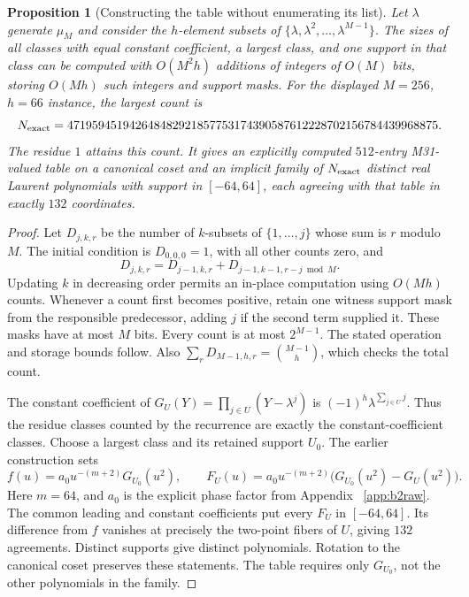 \documentclass[11pt,letterpaper]{article}
\newtheorem{proposition}[theorem]{Proposition}
\theoremstyle{definition}
\theoremstyle{remark}
\begin{document}
\begin{proposition}[Constructing the table without enumerating its list]
\label{prop:implicit-bank}
Let $\lambda$ generate $\mu_M$ and consider the $h$-element subsets of
$\{\lambda,\lambda^2,\ldots,\lambda^{M-1}\}$. The sizes of all classes
with equal constant coefficient, a largest class, and one support in
that class can be computed with $O(M^2h)$ additions of integers of
$O(M)$ bits, storing $O(Mh)$ such integers and support masks.
For the displayed $M=256$, $h=66$ instance, the largest count is
\[
 N_{\rm exact}=
 471959451942648482921857753174390587612228702156784439968875.
\]
The residue $1$ attains this count. It gives an explicitly computed
$512$-entry M31-valued table on a canonical coset and an implicit
family of $N_{\rm exact}$ distinct real Laurent polynomials with
support in $[-64,64]$, each agreeing with that table in exactly
$132$ coordinates.
\end{proposition}
\begin{proof}
Let $D_{j,k,r}$ be the number of $k$-subsets of $\{1,\ldots,j\}$ whose
sum is $r$ modulo $M$. The initial condition is $D_{0,0,0}=1$, with
all other counts zero, and
\[
 D_{j,k,r}=D_{j-1,k,r}+D_{j-1,k-1,r-j\bmod M}.
\]
Updating $k$ in decreasing order permits an in-place computation using
$O(Mh)$ counts. Whenever a count first becomes positive, retain one
witness support mask from the responsible predecessor, adding $j$ if
the second term supplied it. These masks have at most $M$ bits.
Every count is at most $2^{M-1}$. The stated operation and storage
bounds follow. Also
$\sum_rD_{M-1,h,r}=\binom{M-1}h$, which checks the total count.

The constant coefficient of
$G_U(Y)=\prod_{j\in U}(Y-\lambda^j)$ is
$(-1)^h\lambda^{\sum_{j\in U}j}$. Thus the residue classes counted by
the recurrence are exactly the constant-coefficient classes. Choose a
largest class and its retained support $U_0$. The earlier construction
sets
\[
 f(u)=a_0u^{-(m+2)}G_{U_0}(u^2),\qquad
 F_U(u)=a_0u^{-(m+2)}\bigl(G_{U_0}(u^2)-G_U(u^2)\bigr).
\]
Here $m=64$, and $a_0$ is the explicit phase factor from Appendix~
\ref{app:b2raw}. The common leading and constant coefficients put
every $F_U$ in $[-64,64]$. Its difference from $f$ vanishes at precisely
the two-point fibers of $U$, giving $132$ agreements. Distinct
supports give distinct polynomials. Rotation to the canonical coset
preserves these statements. The table requires only $G_{U_0}$, not the
other polynomials in the family.
\end{proof}
\end{document}
